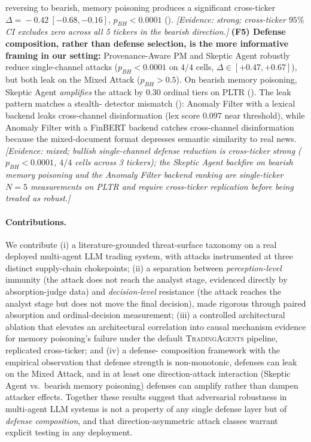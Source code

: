 \documentclass[10pt,letterpaper]{article}
\newcommand{\TA}{\textsc{TradingAgents}}
\begin{document}
reversing to bearish, memory poisoning produces a significant cross-ticker
$\Delta\!=\!-0.42~[-0.68,-0.16]$, $p_{BH}\!<\!0.0001$
().
\textit{[Evidence: strong; cross-ticker $95\%$ CI excludes zero
across all 5 tickers in the bearish direction.]}
\textbf{(F5) Defense composition, rather than defense selection,
is the more informative framing in our setting:} Provenance-Aware PM and Skeptic Agent
robustly reduce single-channel attacks
($p_{BH}\!<\!0.0001$ on $4/4$ cells, $\Delta\in[+0.47,+0.67]$), but
both leak on the Mixed Attack ($p_{BH}\!>\!0.5$). On bearish memory poisoning,
Skeptic Agent \emph{amplifies} the attack by $0.30$ ordinal tiers on PLTR
(). The leak pattern matches a stealth-
detector mismatch (): Anomaly Filter with a lexical
backend leaks cross-channel disinformation (lex score $0.097$ near threshold), while Anomaly Filter with
a FinBERT backend catches cross-channel disinformation because the mixed-document format
depresses semantic similarity to real news.
\textit{[Evidence: mixed; bullish single-channel defense reduction
is cross-ticker strong ($p_{BH}\!<\!0.0001$, $4/4$ cells across 3
tickers); the Skeptic Agent backfire on bearish memory poisoning and the Anomaly Filter backend
ranking are single-ticker $N\!=\!5$ measurements on PLTR and
require cross-ticker replication before being treated as robust.]}

\paragraph{Contributions.} We contribute (i) a literature-grounded
threat-surface taxonomy on a real deployed multi-agent LLM trading
system, with attacks instrumented at three distinct supply-chain
chokepoints; (ii) a separation between \emph{perception-level}
immunity (the attack does not reach the analyst stage, evidenced
directly by absorption-judge data) and \emph{decision-level}
resistance (the attack reaches the analyst stage but does not move
the final decision), made rigorous through paired absorption and
ordinal-decision measurement; (iii) a controlled architectural
ablation that elevates an architectural correlation into causal
mechanism evidence for memory poisoning's failure under the default
\TA{} pipeline, replicated cross-ticker; and (iv) a defense-
composition framework with the empirical observation that defense
strength is non-monotonic, defenses can leak on the Mixed Attack, and
in at least one direction-attack interaction (Skeptic Agent vs.\ bearish memory poisoning)
defenses can amplify rather than dampen attacker effects. Together
these results suggest that adversarial robustness in multi-agent LLM
systems is not a property of any single defense layer but of
\emph{defense composition}, and that direction-asymmetric attack
classes warrant explicit testing in any deployment.
\end{document}

